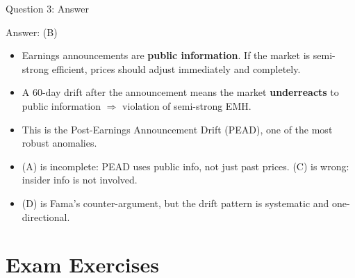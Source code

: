 \documentclass[9pt, aspectratio=169, t]{beamer}
\theoremstyle{definition}
\newenvironment{cminipage}[1]{%
    \par\noindent\hfill\begin{minipage}{#1}\ignorespaces
}{%
    \end{minipage}\hfill\null\par
}
\begin{document}
\begin{frame}{Question 3: Answer}
    \begin{cminipage}{0.95\textwidth}
    \begin{exampleblock}{Answer: (B)}
    \begin{itemize}
        \item Earnings announcements are \textbf{public information}. If the market is semi-strong efficient, prices should adjust immediately and completely.
        \item A 60-day drift after the announcement means the market \textbf{underreacts} to public information $\Rightarrow$ violation of semi-strong EMH.
        \item This is the Post-Earnings Announcement Drift (PEAD), one of the most robust anomalies.
        \item (A) is incomplete: PEAD uses public info, not just past prices. (C) is wrong: insider info is not involved.
        \item (D) is Fama's counter-argument, but the drift pattern is systematic and one-directional.
    \end{itemize}
    \end{exampleblock}
    \end{cminipage}
\end{frame}

\section{Exam Exercises}
\end{document}
